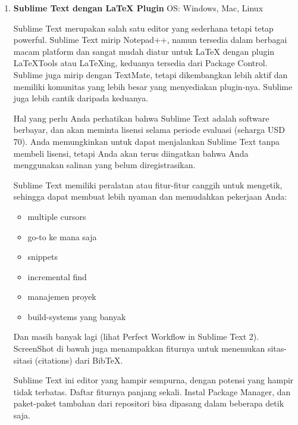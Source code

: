 \begin{enumerate}
\item \textbf{Sublime Text dengan LaTeX Plugin}
\setcounter{numberedCntE}{\theenumi}
\hspace{0,2in}OS: Windows, Mac, Linux

Sublime Text merupakan salah satu editor yang sederhana tetapi tetap powerful. Sublime Text mirip Notepad++, namun tersedia dalam berbagai macam platform dan sangat mudah diatur untuk LaTeX dengan plugin LaTeXTools atau LaTeXing, keduanya tersedia dari Package Control. Sublime juga mirip dengan TextMate, tetapi dikembangkan lebih aktif dan memiliki komunitas yang lebih besar yang menyediakan plugin-nya. Sublime juga lebih cantik daripada keduanya.
\par \vspace{12pt}

Hal yang perlu Anda perhatikan bahwa Sublime Text adalah software berbayar, dan akan meminta lisensi selama periode evaluasi (seharga USD 70). Anda memungkinkan untuk dapat menjalankan Sublime Text tanpa membeli lisensi, tetapi Anda akan terus diingatkan bahwa Anda menggunakan salinan yang belum diregistrasikan.
\par \vspace{12pt}


Sublime Text memiliki peralatan atau fitur-fitur canggih untuk mengetik, sehingga dapat membuat lebih nyaman dan memudahkan pekerjaan Anda:

\begin{itemize}
\item multiple cursors
\item go-to ke mana saja
\item snippets
\item incremental find
\item manajemen proyek
\item build-systems yang banyak
\end{itemize}
Dan masih banyak lagi (lihat Perfect Workflow in Sublime Text 2). ScreenShot di bawah juga menampakkan fiturnya untuk menemukan sitas-sitasi (citations) dari BibTeX.
\par \vspace{12pt}

Sublime Text ini editor yang hampir sempurna, dengan potensi yang hampir tidak terbatas. Daftar fiturnya panjang sekali. Instal Package Manager, dan paket-paket tambahan dari repositori bisa dipasang dalam beberapa detik saja.


\end{enumerate}
